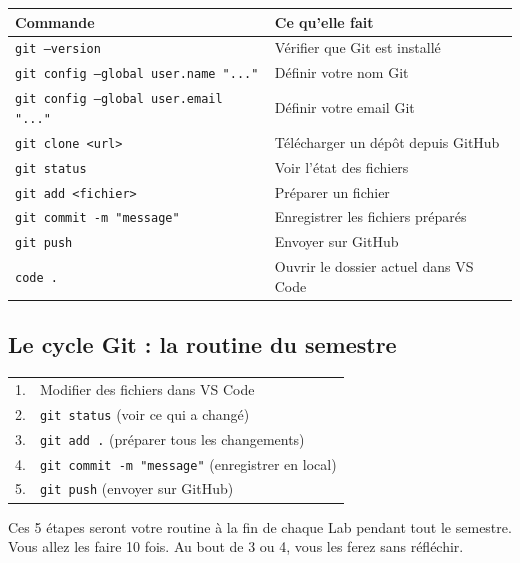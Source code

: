 \documentclass[11pt,a4paper]{article}
\begin{document}
\begin{center}
\begin{tabular}{lp{8cm}}
\toprule
\textbf{Commande} & \textbf{Ce qu'elle fait} \\
\midrule
\texttt{git --version} & Vérifier que Git est installé \\
\texttt{git config --global user.name "..."} & Définir votre nom Git \\
\texttt{git config --global user.email "..."} & Définir votre email Git \\
\texttt{git clone <url>} & Télécharger un dépôt depuis GitHub \\
\texttt{git status} & Voir l'état des fichiers \\
\texttt{git add <fichier>} & Préparer un fichier \\
\texttt{git commit -m "message"} & Enregistrer les fichiers préparés \\
\texttt{git push} & Envoyer sur GitHub \\
\texttt{code .} & Ouvrir le dossier actuel dans VS Code \\
\bottomrule
\end{tabular}
\end{center}

\subsection{Le cycle Git : la routine du semestre}

\begin{center}
\begin{tabular}{rl}
1. & Modifier des fichiers dans VS Code \\
2. & \texttt{git status} \quad (voir ce qui a changé) \\
3. & \texttt{git add .} \quad (préparer tous les changements) \\
4. & \texttt{git commit -m "message"} \quad (enregistrer en local) \\
5. & \texttt{git push} \quad (envoyer sur GitHub) \\
\end{tabular}
\end{center}

\begin{retenirbox}
Ces 5 étapes seront votre routine à la fin de chaque Lab pendant tout le
semestre. Vous allez les faire 10 fois. Au bout de 3 ou 4, vous les ferez
sans réfléchir.
\end{retenirbox}
\end{document}
